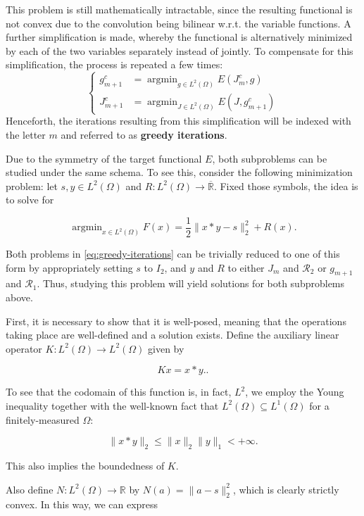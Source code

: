 \documentclass[twocolumn,twoside,a4paper,10pt]{IEEEtran}
\DeclareMathOperator*{\argmin}{\operatorname*{argmin}}
\DeclareMathOperator*{\argmin}{arg\,min}
\begin{document}
This problem is still mathematically intractable, since the resulting functional is not convex due to the convolution being bilinear w.r.t. the variable functions. A further simplification is made, whereby the functional is alternatively minimized by each of the two variables separately instead of jointly. To compensate for this simplification, the process is repeated a few times:
\begin{equation}\label{eq:greedy-iterations}
  \left\{\begin{split}
    g_{m+1}^c &= \argmin_{g\in L^2(\Omega)} E(J_m^c, g) \\
    J_{m+1}^c &= \argmin_{J\in L^2(\Omega)} E(J, g_{m+1}^c)
  \end{split}\right.
\end{equation}
Henceforth, the iterations resulting from this simplification will be indexed with the letter \(m\) and referred to as \textbf{greedy iterations}.

Due to the symmetry of the target functional \(E\), both subproblems can be studied under the same schema. To see this, consider the following minimization problem: let \(s, y\in L^2(\Omega)\) and \(R\colon L^2(\Omega)\to\overline{\mathbb{R}}\). Fixed those symbols, the idea is to solve for

\[
  \argmin_{x\in L^2(\Omega)}F(x) = \frac12\|x\ast y - s\|_2^2 + R(x)
.\]

Both problems in \cref{eq:greedy-iterations} can be trivially reduced to one of this form by appropriately setting \(s\) to \(I_2\), and \(y\) and \(R\) to either \(J_m\) and \(\mathcal{R}_2\) or \(g_{m+1}\) and \(\mathcal{R}_1\). Thus, studying this problem will yield solutions for both subproblems above.

First, it is necessary to show that it is well-posed, meaning that the operations taking place are well-defined and a solution exists. Define the auxiliary linear operator \(K\colon L^2(\Omega)\to L^2(\Omega)\) given by

\[
  Kx=x\ast y.
.\]

To see that the codomain of this function is, in fact, \(L^2\), we employ the Young inequality together with the well-known fact that \(L^2(\Omega)\subseteq L^1(\Omega)\) for a finitely-measured \(\Omega\):

\[
  \|x\ast y\|_2 \leq \|x\|_{2}\|y\|_{1} < +\infty
.\]

This also implies the boundedness of \(K\).

Also define \(N\colon L^2(\Omega)\to \mathbb{R}\) by \(N(a) = \|a - s\|_{2}^2\), which is clearly strictly convex. In this way, we can express
\end{document}
